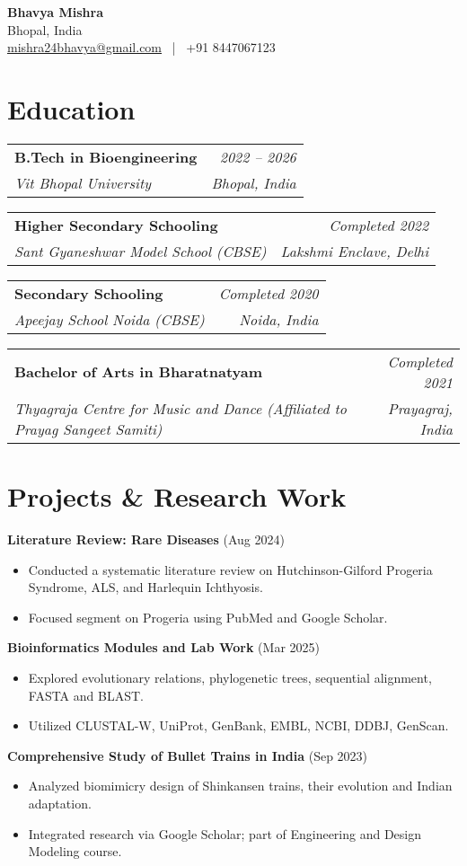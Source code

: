 \documentclass[a4paper,10pt]{article}
\makeatletter
\newcommand{\resumeItem}[1]{\item\small{#1}}
\newcommand{\resumeSubheading}[4]{
  \vspace{-2pt}\item
    \begin{tabular*}{0.97\textwidth}[t]{l@{\extracolsep{\fill}}r}
      \textbf{#1} & \textit{#2} \\
      \textit{#3} & \textit{#4} \\
    \end{tabular*}\vspace{-5pt}
}
\makeatother
\begin{document}
\begin{center}
    \textbf{\Huge Bhavya Mishra} \\[1pt]
    Bhopal, India \\
    \href{mailto:mishra24bhavya@gmail.com}{mishra24bhavya@gmail.com} ~|~ +91 8447067123
\end{center}

\section*{Education}
\resumeSubheading
  {B.Tech in Bioengineering}{2022 -- 2026}
  {Vit Bhopal University}{Bhopal, India}

\resumeSubheading
  {Higher Secondary Schooling}{Completed 2022}
  {Sant Gyaneshwar Model School (CBSE)}{Lakshmi Enclave, Delhi}

\resumeSubheading
  {Secondary Schooling}{Completed 2020}
  {Apeejay School Noida (CBSE)}{Noida, India}

\resumeSubheading
  {Bachelor of Arts in Bharatnatyam}{Completed 2021}
  {Thyagraja Centre for Music and Dance (Affiliated to Prayag Sangeet Samiti)}{Prayagraj, India}

\section*{Projects \& Research Work}
\resumeItem{\textbf{Literature Review: Rare Diseases} (Aug 2024)
\begin{itemize}
  \item Conducted a systematic literature review on Hutchinson-Gilford Progeria Syndrome, ALS, and Harlequin Ichthyosis.
  \item Focused segment on Progeria using PubMed and Google Scholar.
\end{itemize}}

\resumeItem{\textbf{Bioinformatics Modules and Lab Work} (Mar 2025)
\begin{itemize}
  \item Explored evolutionary relations, phylogenetic trees, sequential alignment, FASTA and BLAST.
  \item Utilized CLUSTAL-W, UniProt, GenBank, EMBL, NCBI, DDBJ, GenScan.
\end{itemize}}

\resumeItem{\textbf{Comprehensive Study of Bullet Trains in India} (Sep 2023)
\begin{itemize}
  \item Analyzed biomimicry design of Shinkansen trains, their evolution and Indian adaptation.
  \item Integrated research via Google Scholar; part of Engineering and Design Modeling course.
\end{itemize}}
\end{document}
